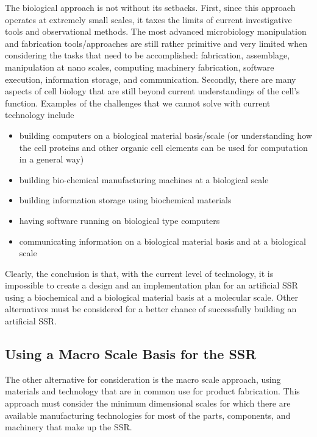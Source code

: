 The biological approach is not without its setbacks. First, since this approach operates at extremely small scales, it taxes the limits of current investigative tools and observational methods. The most advanced microbiology manipulation and fabrication tools/approaches are still rather primitive and very limited when considering the tasks that need to be accomplished: fabrication, assemblage, manipulation at nano scales, computing machinery fabrication, software execution, information storage, and communication. Secondly, there are many aspects of cell biology that are still beyond current understandings of the cell’s function.  Examples of the challenges that we cannot solve with current technology include

\begin{itemize}
\item building computers on a biological material basis/scale (or
understanding how the cell proteins and other organic cell elements can
be used for computation in a general way)
\item building bio-chemical manufacturing machines at a biological
scale
\item building information storage using biochemical materials
\item having software running on biological type computers
\item communicating information on a biological material basis and at a biological scale
\end{itemize}

Clearly, the conclusion is that, with the current level of
technology, it is impossible to create a design and an implementation
plan for an artificial SSR using a biochemical and a biological material
basis at a molecular scale. Other alternatives must be considered for a better
chance of successfully building an artificial SSR.

\subsection{Using a Macro Scale Basis for the SSR}

The other alternative for consideration is the macro scale approach, using materials
and technology that are in common use for product fabrication.
This approach must consider the minimum
dimensional scales for which there are available manufacturing
technologies for most of the parts, components, and machinery that make
up the SSR.  

